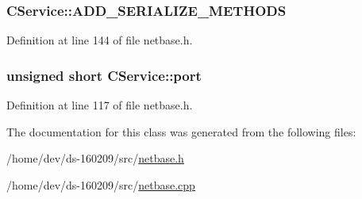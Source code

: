 \subsubsection[{A\+D\+D\+\_\+\+S\+E\+R\+I\+A\+L\+I\+Z\+E\+\_\+\+M\+E\+T\+H\+O\+D\+S}]{\setlength{\rightskip}{0pt plus 5cm}C\+Service\+::\+A\+D\+D\+\_\+\+S\+E\+R\+I\+A\+L\+I\+Z\+E\+\_\+\+M\+E\+T\+H\+O\+D\+S}\label{class_c_service_a3347aa84bd8f98ae853307ad4e47a4f5}


Definition at line 144 of file netbase.\+h.

\hypertarget{class_c_service_aef17734203dc2125cbdf4d23e50be410}{}
\subsubsection[{port}]{\setlength{\rightskip}{0pt plus 5cm}unsigned short C\+Service\+::port\hspace{0.3cm}{\ttfamily [protected]}}\label{class_c_service_aef17734203dc2125cbdf4d23e50be410}


Definition at line 117 of file netbase.\+h.



The documentation for this class was generated from the following files\+:\begin{DoxyCompactItemize}
\item 
/home/dev/ds-\/160209/src/\hyperlink{netbase_8h}{netbase.\+h}\item 
/home/dev/ds-\/160209/src/\hyperlink{netbase_8cpp}{netbase.\+cpp}\end{DoxyCompactItemize}
